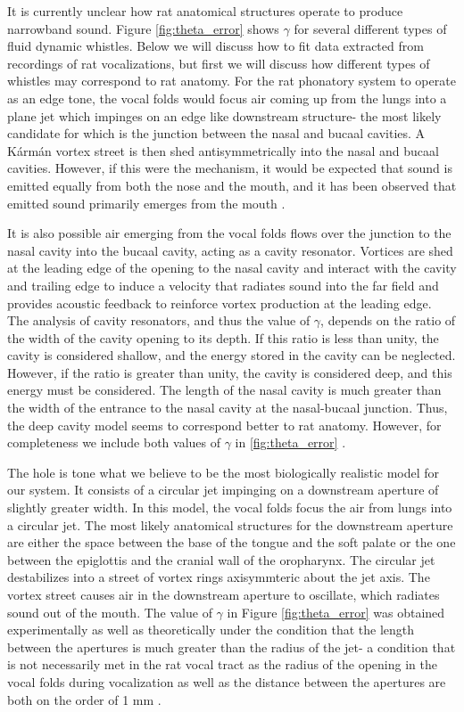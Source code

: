 \documentclass[twocolumn, prl]{revtex4}
\begin{document}
It is currently unclear how rat anatomical structures operate to produce narrowband sound. Figure \ref{fig:theta_error} shows $\gamma$ for several different types of fluid dynamic whistles. Below we will discuss how to fit data extracted from recordings of rat vocalizations, but first we will discuss how different types of whistles may correspond to rat anatomy. For the rat phonatory system to operate as an edge tone, the vocal folds would focus air coming up from the lungs into a plane jet which impinges on an edge like downstream structure- the most likely candidate for which is the junction between the nasal and bucaal cavities. A Kármán vortex street is then shed antisymmetrically into the nasal and bucaal cavities. However, if this were the mechanism, it would be expected that sound is emitted equally from both the nose and the mouth, and it has been observed that emitted sound primarily emerges from the mouth \cite{Holger1977,Howe2008}.

It is also possible air emerging from the vocal folds flows over the junction to the nasal cavity into the bucaal cavity, acting as a cavity resonator. Vortices are shed at the leading edge of the opening to the nasal cavity and interact with the cavity and trailing edge to induce a velocity that radiates sound into the far field and provides acoustic feedback to reinforce vortex production at the leading edge. The analysis of cavity resonators, and thus the value of $\gamma$, depends on the ratio of the width of the cavity opening to its depth. If this ratio is less than unity, the cavity is considered shallow, and the energy stored in the cavity can be neglected. However, if the ratio is greater than unity, the cavity is considered deep, and this energy must be considered. The length of the nasal cavity is much greater than the width of the entrance to the nasal cavity at the nasal-bucaal junction. Thus, the deep cavity model seems to correspond better to rat anatomy. However, for completeness we include both values of $\gamma$ in \ref{fig:theta_error} \cite{Howe2008}.

The hole is tone what we believe to be the most biologically realistic model for our system. It consists of a circular jet impinging on a downstream aperture of slightly greater width. In this model, the vocal folds focus the air from lungs into a circular jet. The most likely anatomical structures for the downstream aperture are either the space between the base of the tongue and the soft palate or the one between the epiglottis and the cranial wall of the oropharynx. The circular jet destabilizes into a street of vortex rings axisymmteric about the jet axis. The vortex street causes air in the downstream aperture to oscillate, which radiates sound out of the mouth. The value of $\gamma$ in Figure \ref{fig:theta_error} was obtained experimentally as well as theoretically under the condition that the length between the apertures is much greater than the radius of the jet- a condition that is not necessarily met in the rat vocal tract as the radius of the opening in the vocal folds during vocalization as well as the distance between the apertures are both on the order of 1 mm \cite{Brudzynski2010,Chanaud1965,Howe2008}.
\end{document}
